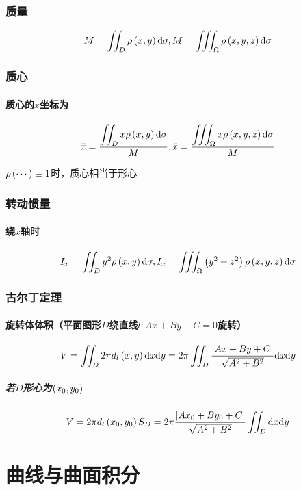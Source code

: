 \documentclass{article}
\begin{document}
\subsubsection{质量}

\[M=\iint_D\rho\left(x,y\right)\mathrm d\sigma,
    M=\iiint_\Omega\rho\left(x,y,z\right)\mathrm d\sigma\]

\subsubsection{质心}

\paragraph{质心的$x$坐标为}

\[\bar x=\frac{\displaystyle\iint_Dx\rho\left(x,y\right)\mathrm d\sigma}M,
    \bar x=\frac{\displaystyle\iiint_\Omega x\rho\left(x,y,z\right)\mathrm d\sigma}M\]

$\rho\left(\cdots\right)\equiv1$时，质心相当于形心

\subsubsection{转动惯量}

\paragraph{绕$x$轴时}

\[I_x=\iint_Dy^2\rho\left(x,y\right)\mathrm d\sigma,
    I_x=\iiint_\Omega\left(y^2+z^2\right)\rho\left(x,y,z\right)\mathrm d\sigma\]

\subsubsection{古尔丁定理}

\paragraph{旋转体体积（平面图形$D$绕直线$l:Ax+By+C=0$旋转）}

\[V=\iint_D2\pi d_l\left(x,y\right)\mathrm d x\mathrm d y=2\pi\iint_D\frac{\left|Ax+By+C\right|}{\sqrt{A^2+B^2}}\mathrm d x\mathrm d y\]

\subparagraph{若$D$形心为$\left(x_0,y_0\right)$}

\[V=2\pi d_l\left(x_0,y_0\right)S_D=2\pi\frac{\left|Ax_0+By_0+C\right|}{\sqrt{A^2+B^2}}\iint_D\mathrm d x\mathrm d y\]


\section{曲线与曲面积分}
\end{document}
